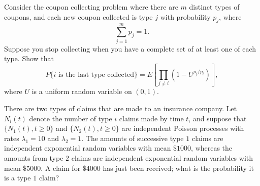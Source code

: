 \begin{exercise}
\label{ex:counting-processes-58}
Consider the coupon collecting problem where there are $m$ distinct types of coupons, and each new coupon collected is type $j$ with probability $p_j$, where
\[
\sum_{j=1}^m p_j=1.
\]
Suppose you stop collecting when you have a complete set of at least one of each type. Show that
\[
P\{i\text{ is the last type collected}\}
=
E\left[
\prod_{j\ne i}
\left(1-U^{p_j/p_i}\right)
\right],
\]
where $U$ is a uniform random variable on $(0,1)$.
\end{exercise}


\begin{exercise}
\label{ex:counting-processes-59}
There are two types of claims that are made to an insurance company. Let $N_i(t)$ denote the number of type $i$ claims made by time $t$, and suppose that $\{N_1(t),t\ge 0\}$ and $\{N_2(t),t\ge 0\}$ are independent Poisson processes with rates $\lambda_1=10$ and $\lambda_2=1$. The amounts of successive type $1$ claims are independent exponential random variables with mean $\$1000$, whereas the amounts from type $2$ claims are independent exponential random variables with mean $\$5000$. A claim for $\$4000$ has just been received; what is the probability it is a type $1$ claim?
\end{exercise}

